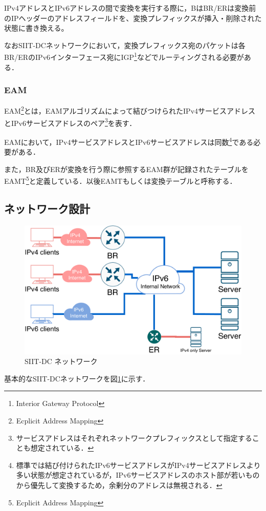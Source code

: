 IPv4アドレスとIPv6アドレスの間で変換を実行する際に，BはBR/ERは変換前のIPヘッダーのアドレスフィールドを、変換プレフィックスが挿入・削除された状態に書き換える。

なおSIIT-DCネットワークにおいて，変換プレフィックス宛のパケットは各BR/ERのIPv6インターフェース宛にIGP\footnote{Interior Gateway Protocol}などでルーティングされる必要がある．

\subsubsection{EAM}
EAM\footnote{Ecplicit Address Mapping}とは，EAMアルゴリズム\cite{RFC7757}によって結びつけられたIPv4サービスアドレスとIPv6サービスアドレスのペア\footnote{サービスアドレスはそれぞれネットワークプレフィックスとして指定することも想定されている．}を表す．

EAMにおいて，IPv4サービスアドレスとIPv6サービスアドレスは同数\footnote{標準では結び付けられたIPv6サービスアドレスがIPv4サービスアドレスより多い状態が想定されているが，IPv6サービスアドレスのホスト部が若いものから優先して変換するため，余剰分のアドレスは無視される．}である必要がある．

また，BR及びERが変換を行う際に参照するEAM群が記録されたテーブルをEAMT\footnote{Ecplicit Address Mapping}と定義している．以後EAMTもしくは変換テーブルと呼称する．



\subsection{ネットワーク設計}
\label{issue:siit-dc:network}
\begin{figure}[h]
    \begin{center}
      \includegraphics[width=12cm,pagebox=cropbox,clip]{img/siit-dc-network.pdf}
    \end{center}
    \caption{SIIT-DC ネットワーク}
    \label{fig:siit-dc_network}
\end{figure}
基本的なSIIT-DCネットワークを図\ref{fig:siit-dc_network}に示す．

